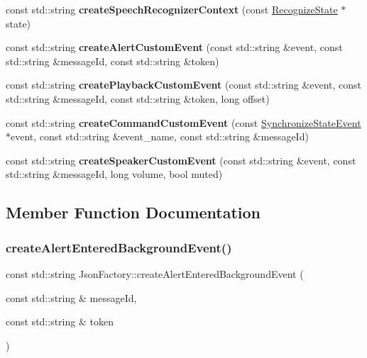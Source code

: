 \begin{DoxyCompactItemize}
const std\+::string {\bfseries create\+Speech\+Recognizer\+Context} (const \hyperlink{structAVSJson_1_1RecognizeState}{Recognize\+State} $\ast$state)
\item 
\mbox{\label{classAVSJson_1_1JsonFactory_aec94584a476c033fd5e0be46175a01a2}} 
const std\+::string {\bfseries create\+Alert\+Custom\+Event} (const std\+::string \&event, const std\+::string \&message\+Id, const std\+::string \&token)
\item 
\mbox{\label{classAVSJson_1_1JsonFactory_a62b85fb06f0c29bdd3a61d2d42e55c97}} 
const std\+::string {\bfseries create\+Playback\+Custom\+Event} (const std\+::string \&event, const std\+::string \&message\+Id, const std\+::string \&token, long offset)
\item 
\mbox{\label{classAVSJson_1_1JsonFactory_a6ab1ee5689207152f2c77357b66240c2}} 
const std\+::string {\bfseries create\+Command\+Custom\+Event} (const \hyperlink{structAVSJson_1_1SynchronizeStateEvent}{Synchronize\+State\+Event} $\ast$event, const std\+::string \&event\+\_\+name, const std\+::string \&message\+Id)
\item 
\mbox{\label{classAVSJson_1_1JsonFactory_a5d9ba26245a2a4dd1439f04da14c3abd}} 
const std\+::string {\bfseries create\+Speaker\+Custom\+Event} (const std\+::string \&event, const std\+::string \&message\+Id, long volume, bool muted)
\end{DoxyCompactItemize}


\subsection{Member Function Documentation}
\mbox{\label{classAVSJson_1_1JsonFactory_a650bd9287a8cc3975ec510f7c816c1d8}} 
\subsubsection{\texorpdfstring{create\+Alert\+Entered\+Background\+Event()}{createAlertEnteredBackgroundEvent()}}
{\footnotesize\ttfamily const std\+::string Json\+Factory\+::create\+Alert\+Entered\+Background\+Event (\begin{DoxyParamCaption}\item[{const std\+::string \&}]{message\+Id,  }\item[{const std\+::string \&}]{token }\end{DoxyParamCaption})}



